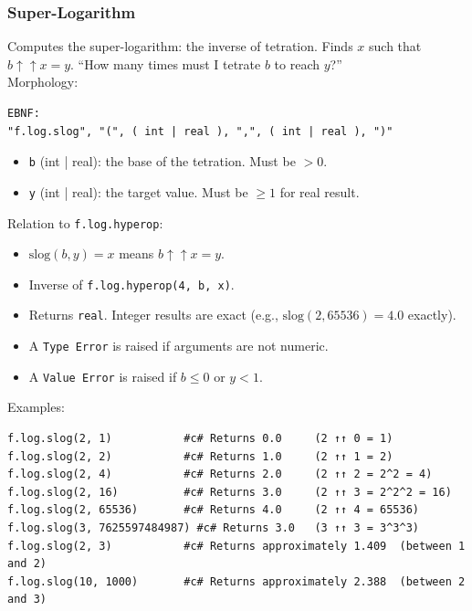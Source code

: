 \subsubsection{Super-Logarithm}
Computes the super-logarithm: the inverse of tetration. Finds $x$ such that $b \uparrow\uparrow x = y$. ``How many times must I tetrate $b$ to reach $y$?''\\
Morphology:
\begin{verbatim}
EBNF:
"f.log.slog", "(", ( int | real ), ",", ( int | real ), ")"
\end{verbatim}
\begin{itemize}
\item \texttt{b} (int | real): the base of the tetration. Must be $> 0$.
\item \texttt{y} (int | real): the target value. Must be $\geq 1$ for real result.
\end{itemize}

\noindent Relation to \texttt{f.log.hyperop}:
\begin{itemize}
\item $\text{slog}(b, y) = x$ means $b \uparrow\uparrow x = y$.
\item Inverse of \texttt{f.log.hyperop(4, b, x)}.
\end{itemize}

\begin{itemize}
\item Returns \texttt{real}. Integer results are exact (e.g., $\text{slog}(2, 65536) = 4.0$ exactly).
\item A \texttt{Type Error} is raised if arguments are not numeric.
\item A \texttt{Value Error} is raised if $b \leq 0$ or $y < 1$.
\end{itemize}

Examples:
\begin{verbatim}
f.log.slog(2, 1)           #c# Returns 0.0     (2 ↑↑ 0 = 1)
f.log.slog(2, 2)           #c# Returns 1.0     (2 ↑↑ 1 = 2)
f.log.slog(2, 4)           #c# Returns 2.0     (2 ↑↑ 2 = 2^2 = 4)
f.log.slog(2, 16)          #c# Returns 3.0     (2 ↑↑ 3 = 2^2^2 = 16)
f.log.slog(2, 65536)       #c# Returns 4.0     (2 ↑↑ 4 = 65536)
f.log.slog(3, 7625597484987) #c# Returns 3.0   (3 ↑↑ 3 = 3^3^3)
f.log.slog(2, 3)           #c# Returns approximately 1.409  (between 1 and 2)
f.log.slog(10, 1000)       #c# Returns approximately 2.388  (between 2 and 3)
\end{verbatim}

